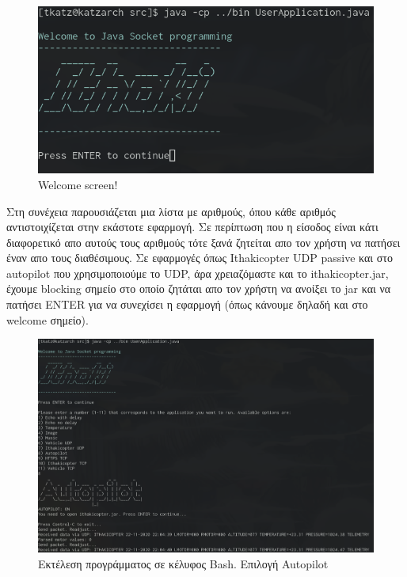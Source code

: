 \documentclass[hidelinks, 12pt, a4paper]{article}
\begin{document}
\begin{figure}[h!]
\centering
	\includegraphics[height=.3\textheight, width=\textwidth]{assets/ui_welcome.png}
	\caption{Welcome screen!} 
    \label{fig:ui}
\end{figure}


Στη συνέχεια παρουσιάζεται μια λίστα με αριθμούς, όπου κάθε αριθμός αντιστοιχίζεται στην εκάστοτε εφαρμογή. Σε περίπτωση που η είσοδος είναι κάτι διαφορετικό απο αυτούς τους αριθμούς τότε ξανά ζητείται απο τον χρήστη να πατήσει έναν απο τους διαθέσιμους. Σε εφαρμογές όπως Ithakicopter UDP passive και στο autopilot που χρησιμοποιούμε το UDP, άρα χρειαζόμαστε και το ithakicopter.jar, έχουμε blocking σημείο στο οποίο ζητάται απο τον χρήστη να ανοίξει το jar και να πατήσει ENTER για να συνεχίσει η εφαρμογή (όπως κάνουμε δηλαδή και στο welcome σημείο).

\begin{figure}[h!]
\centering
	\includegraphics[height=.3\textheight, width=\textwidth]{assets/ui.png}
	\caption{Εκτέλεση προγράμματος σε κέλυφος Bash. Επιλογή Autopilot} 
    \label{fig:ui}
\end{figure}
\end{document}
